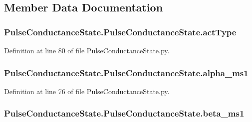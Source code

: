 \subsection{Member Data Documentation}
\hypertarget{class_pulse_conductance_state_1_1_pulse_conductance_state_a0677d7b972a6f6a12abc666212a12297}{
\subsubsection[{act\-Type}]{\setlength{\rightskip}{0pt plus 5cm}Pulse\-Conductance\-State.\-Pulse\-Conductance\-State.\-act\-Type}}\label{class_pulse_conductance_state_1_1_pulse_conductance_state_a0677d7b972a6f6a12abc666212a12297}


Definition at line 80 of file Pulse\-Conductance\-State.\-py.

\hypertarget{class_pulse_conductance_state_1_1_pulse_conductance_state_a5fe4e2c9035df43a1e8eb9d66d669e14}{
\subsubsection[{alpha\-\_\-ms1}]{\setlength{\rightskip}{0pt plus 5cm}Pulse\-Conductance\-State.\-Pulse\-Conductance\-State.\-alpha\-\_\-ms1}}\label{class_pulse_conductance_state_1_1_pulse_conductance_state_a5fe4e2c9035df43a1e8eb9d66d669e14}


Definition at line 76 of file Pulse\-Conductance\-State.\-py.

\hypertarget{class_pulse_conductance_state_1_1_pulse_conductance_state_a8ebc0c29d97fa09699d7dfb724e94f82}{
\subsubsection[{beta\-\_\-ms1}]{\setlength{\rightskip}{0pt plus 5cm}Pulse\-Conductance\-State.\-Pulse\-Conductance\-State.\-beta\-\_\-ms1}}\label{class_pulse_conductance_state_1_1_pulse_conductance_state_a8ebc0c29d97fa09699d7dfb724e94f82}


